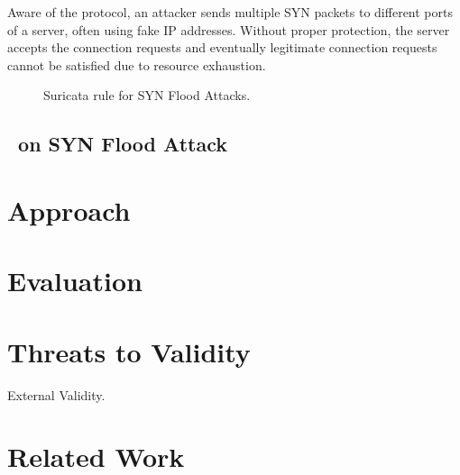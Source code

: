 \documentclass[conference]{IEEEtran}
\begin{document}
Aware of the
protocol, an attacker sends multiple SYN packets to different ports of
a server, often using fake IP addresses. Without proper protection,
the server accepts the connection requests and eventually legitimate
connection requests cannot be satisfied due to resource exhaustion.

\begin{figure}[t]
  
  \caption{Suricata rule for SYN Flood Attacks.}
  \label{fig:synflood-example}
\end{figure}

\subsection{\tname\ on SYN Flood Attack}


\section{Approach}


\section{Evaluation}


\section{Threats to Validity}

External Validity. 

\section{Related Work}


\balance


\end{document}
